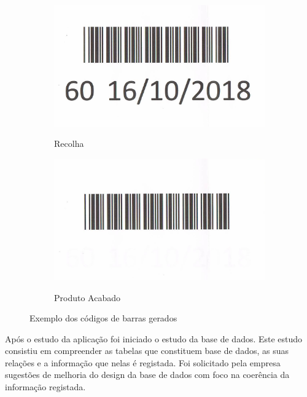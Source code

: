 \begin{figure}[H]
	\centering
	
	\begin{subfigure}[t]{0.4\linewidth}
		\includegraphics[width=\linewidth]{figuras/AppAccess/2-CodBarras.jpg}
		\label{fig:app_access_cb_recolha}
		\caption{Recolha}
	\end{subfigure}
	\begin{subfigure}[t]{0.4\linewidth}
		\includegraphics[width=\linewidth]{figuras/AppAccess/5-CodBarras.jpg}
		\label{fig:app_access_cb_prod_acabado}
		\caption{Produto Acabado}
	\end{subfigure}
	
	\caption{Exemplo dos códigos de barras gerados}
	\label{fig:app_access_cb}
\end{figure}


Após o estudo da aplicação foi iniciado o estudo da base de dados. Este estudo consistiu em compreender as tabelas que constituem base de dados, as suas relações e a informação que nelas é registada. Foi solicitado pela empresa sugestões de melhoria do design da base de dados com foco na coerência da informação registada.


